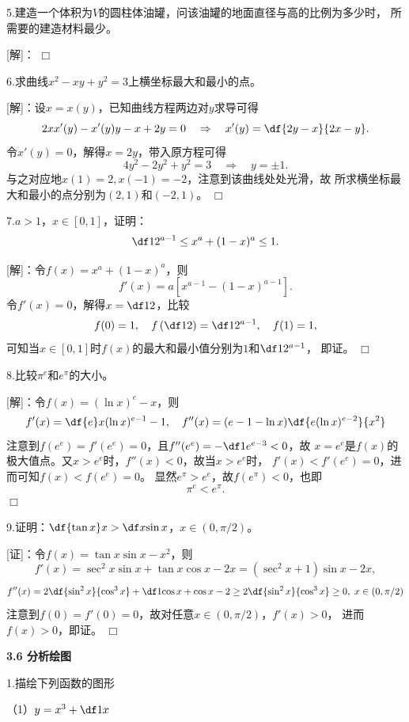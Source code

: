 5.建造一个体积为$V$的圆柱体油罐，问该油罐的地面直径与高的比例为多少时，
所需要的建造材料最少。

[解]：
\hfill$\Box$

\bigskip

6.求曲线$x^2-xy+y^2=3$上横坐标最大和最小的点。

[解]：设$x=x(y)$，已知曲线方程两边对$y$求导可得
$$2xx'(y)-x'(y)y-x+2y=0
\quad\Rightarrow\quad
x'(y)=\df{2y-x}{2x-y}.$$
令$x'(y)=0$，解得$x=2y$，带入原方程可得
$$4y^2-2y^2+y^2=3
\quad\Rightarrow\quad
y=\pm1.$$
与之对应地$x(1)=2,x(-1)=-2$，注意到该曲线处处光滑，故
所求横坐标最大和最小的点分别为$(2,1)$和$(-2,1)$。
\hfill$\Box$

\bigskip

7.$a>1$，$x\in[0,1]$，证明：
$$\df1{2^{a-1}}\leq x^a+(1-x)^a\leq 1.$$

[解]：令$f(x)=x^a+(1-x)^a$，则
$$f'(x)=a[x^{a-1}-(1-x)^{a-1}].$$
令$f'(x)=0$，解得$x=\df12$，比较
$$f(0)=1,\quad f\left(\df12\right)=\df1{2^{a-1}},
\quad f(1)=1,$$
可知当$x\in[0,1]$时$f(x)$的最大和最小值分别为$1$和$\df1{2^{a-1}}$，
即证。
\hfill$\Box$

\bigskip

8.比较$\pi^e$和$e^{\pi}$的大小。

[解]：令$f(x)=(\ln x)^{e}-x$，则
$$f'(x)=\df{e}x(\ln x)^{e-1}-1,
\quad
f''(x)=(e-1-\ln x)\df{e(\ln x)^{e-2}}{x^2}
$$
注意到$f(e^e)=f'(e^e)=0$，且$f''(e^e)=-\df1{e^{e-3}}<0$，故
$x=e^e$是$f(x)$的极大值点。又$x>e^e$时，$f''(x)<0$，故当$x>e^e$时，
$f'(x)<f'(e^e)=0$，进而可知$f(x)<f(e^e)=0$。
显然$e^{\pi}>e^e$，故$f(e^{\pi})<0$，也即
$$\pi^e<e^{\pi}.$$
\hfill$\Box$

\bigskip

9.证明：$\df{\tan x}x>\df x{\sin x}$，$x\in(0,\pi/2)$。

[证]：令$f(x)=\tan x\sin x-x^2$，则
$$f'(x)=\sec^2x\sin x+\tan x\cos x-2x=(\sec^2x+1)\sin x-2x,$$
$$f''(x)
=2\df{\sin^2x}{\cos^3x}+\df1{\cos x}+\cos x-2
\geq 2\df{\sin^2x}{\cos^3x}\geq 0,\;x\in(0,\pi/2)$$
注意到$f(0)=f'(0)=0$，故对任意$x\in(0,\pi/2)$，$f'(x)>0$，
进而$f(x)>0$，即证。
\hfill$\Box$

\begin{center}
	\bf 3.6 分析绘图
\end{center}

\bigskip

1.描绘下列函数的图形

（1）$y=x^3+\df1x$

